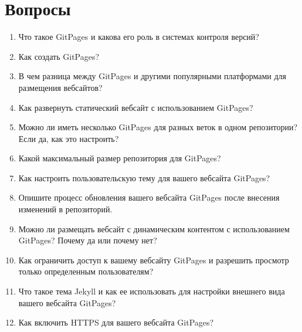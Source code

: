 \documentclass[letterpaper,10pt,russian]{sphinxmanual}
\begin{document}
\section{Вопросы}
\label{\detokenize{educational_materials/github_pages/quiz:id1}}\label{\detokenize{educational_materials/github_pages/quiz::doc}}\begin{enumerate}
%
\item {} 
\sphinxAtStartPar
Что такое GitPages и какова его роль в системах контроля версий?

\item {} 
\sphinxAtStartPar
Как создать GitPages?

\item {} 
\sphinxAtStartPar
В чем разница между GitPages и другими популярными платформами для размещения веб\sphinxhyphen{}сайтов?

\item {} 
\sphinxAtStartPar
Как развернуть статический веб\sphinxhyphen{}сайт с использованием GitPages?

\item {} 
\sphinxAtStartPar
Можно ли иметь несколько GitPages для разных веток в одном репозитории? Если да, как это настроить?

\item {} 
\sphinxAtStartPar
Какой максимальный размер репозитория для GitPages?

\item {} 
\sphinxAtStartPar
Как настроить пользовательскую тему для вашего веб\sphinxhyphen{}сайта GitPages?

\item {} 
\sphinxAtStartPar
Опишите процесс обновления вашего веб\sphinxhyphen{}сайта GitPages после внесения изменений в репозиторий.

\item {} 
\sphinxAtStartPar
Можно ли размещать веб\sphinxhyphen{}сайт с динамическим контентом с использованием GitPages? Почему да или почему нет?

\item {} 
\sphinxAtStartPar
Как ограничить доступ к вашему веб\sphinxhyphen{}сайту GitPages и разрешить просмотр только определенным пользователям?

\item {} 
\sphinxAtStartPar
Что такое тема Jekyll и как ее использовать для настройки внешнего вида вашего веб\sphinxhyphen{}сайта GitPages?

\item {} 
\sphinxAtStartPar
Как включить HTTPS для вашего веб\sphinxhyphen{}сайта GitPages?


\end{enumerate}
\end{document}
